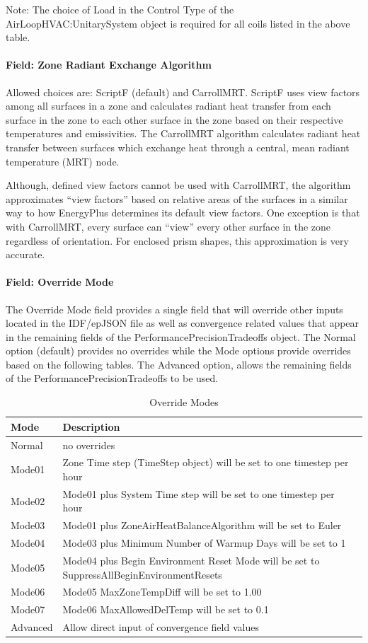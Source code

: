Note: The choice of Load in the Control Type of the AirLoopHVAC:UnitarySystem object is required for all coils listed in the above table.

\paragraph{Field: Zone Radiant Exchange Algorithm}\label{zone-radiant-exchange-algorithm}

Allowed choices are: ScriptF (default) and CarrollMRT. ScriptF uses view factors among all surfaces in a zone and calculates radiant heat transfer from each surface in the zone to each other surface in the zone based on their respective temperatures and emissivities. The CarrollMRT algorithm calculates radiant heat transfer between surfaces which exchange heat through a central, mean radiant temperature (MRT) node.

Although, defined view factors cannot be used with CarrollMRT, the algorithm approximates ``view factors'' based on relative areas of the surfaces in a similar way to how EnergyPlus determines its default view factors. One exception is that with CarrollMRT, every surface can ``view'' every other surface in the zone regardless of orientation. For enclosed prism shapes, this approximation is very accurate.

\paragraph{Field: Override Mode}\label{override-mode}

The Override Mode field provides a single field that will override other inputs located in the IDF/epJSON file as well as convergence related values that appear in the remaining fields of the PerformancePrecisionTradeoffs object. The Normal option (default) provides no overrides while the Mode options provide overrides based on the following tables. The Advanced option, allows the remaining fields of the PerformancePrecisionTradeoffs to be used. 

\begin{longtable}[c]{p{1.5in}p{5.0in}}
\caption{Override Modes\label{table:override_modes}} \tabularnewline
\toprule
Mode & Description \tabularnewline
\midrule
\endfirsthead

Normal & no overrides\tabularnewline
Mode01 & Zone Time step (TimeStep object) will be set to one timestep per hour\tabularnewline
Mode02 & Mode01 plus System Time step will be set to one timestep per hour\tabularnewline
Mode03 & Mode01 plus ZoneAirHeatBalanceAlgorithm will be set to Euler\tabularnewline
Mode04 & Mode03 plus Minimum Number of Warmup Days will be set to 1\tabularnewline
Mode05 & Mode04 plus Begin Environment Reset Mode will be set to SuppressAllBeginEnvironmentResets\tabularnewline
Mode06 & Mode05 MaxZoneTempDiff will be set to 1.00\tabularnewline
Mode07 & Mode06 MaxAllowedDelTemp will be set to 0.1\tabularnewline
Advanced& Allow direct input of convergence field values\tabularnewline

\bottomrule
\end{longtable}

